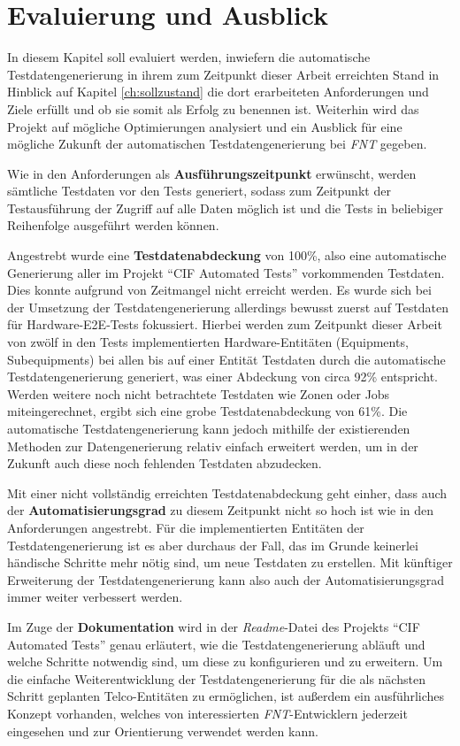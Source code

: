 \chapter{Evaluierung und Ausblick}\label{ch:evalundausblick}
In diesem Kapitel soll evaluiert werden, inwiefern die automatische Testdatengenerierung in ihrem zum Zeitpunkt dieser Arbeit erreichten Stand in Hinblick auf Kapitel \ref{ch:sollzustand} die dort erarbeiteten Anforderungen und Ziele erfüllt und ob sie somit als Erfolg zu benennen ist. Weiterhin wird das Projekt auf mögliche Optimierungen analysiert und ein Ausblick für eine mögliche Zukunft der automatischen Testdatengenerierung bei \textit{FNT} gegeben.

Wie in den Anforderungen als \textbf{Ausführungszeitpunkt} erwünscht, werden sämtliche Testdaten vor den Tests generiert, sodass zum Zeitpunkt der Testausführung der Zugriff auf alle Daten möglich ist und die Tests in beliebiger Reihenfolge ausgeführt werden können.

Angestrebt wurde eine \textbf{Testdatenabdeckung} von 100\%, also eine automatische Generierung aller im Projekt \enquote{\ac{CIF} Automated Tests} vorkommenden Testdaten. Dies konnte aufgrund von Zeitmangel nicht erreicht werden. Es wurde sich bei der Umsetzung der Testdatengenerierung allerdings bewusst zuerst auf Testdaten für Hardware-\ac{E2E}-Tests fokussiert. Hierbei werden zum Zeitpunkt dieser Arbeit von zwölf in den Tests implementierten Hardware-Entitäten (Equipments, Subequipments) bei allen bis auf einer Entität Testdaten durch die automatische Testdatengenerierung generiert, was einer Abdeckung von circa 92\% entspricht. Werden weitere noch nicht betrachtete Testdaten wie Zonen oder Jobs miteingerechnet, ergibt sich eine grobe Testdatenabdeckung von 61\%. Die automatische Testdatengenerierung kann jedoch mithilfe der existierenden Methoden zur Datengenerierung relativ einfach erweitert werden, um in der Zukunft auch diese noch fehlenden Testdaten abzudecken.

Mit einer nicht vollständig erreichten Testdatenabdeckung geht einher, dass auch der \textbf{Automatisierungsgrad} zu diesem Zeitpunkt nicht so hoch ist wie in den Anforderungen angestrebt. Für die implementierten Entitäten der Testdatengenerierung ist es aber durchaus der Fall, das im Grunde keinerlei händische Schritte mehr nötig sind, um neue Testdaten zu erstellen. Mit künftiger Erweiterung der Testdatengenerierung kann also auch der Automatisierungsgrad immer weiter verbessert werden.

Im Zuge der \textbf{Dokumentation} wird in der \textit{Readme}-Datei des Projekts \enquote{\ac{CIF} Automated Tests} genau erläutert, wie die Testdatengenerierung abläuft und welche Schritte notwendig sind, um diese zu konfigurieren und zu erweitern. Um die einfache Weiterentwicklung der Testdatengenerierung für die als nächsten Schritt geplanten Telco-Entitäten zu ermöglichen, ist außerdem ein ausführliches Konzept vorhanden, welches von interessierten \textit{FNT}-Entwicklern jederzeit eingesehen und zur Orientierung verwendet werden kann.

